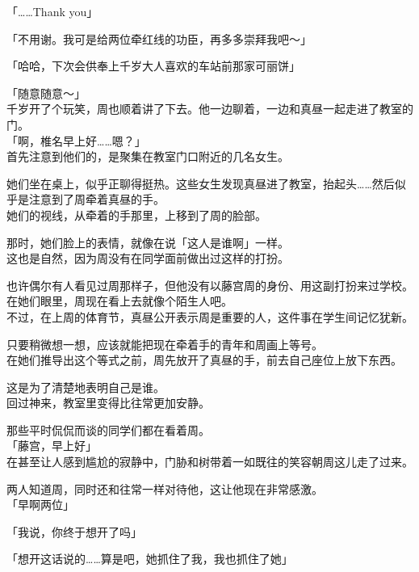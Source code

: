 「……Thank you」

「不用谢。我可是给两位牵红线的功臣，再多多崇拜我吧～」

「哈哈，下次会供奉上千岁大人喜欢的车站前那家可丽饼」

「随意随意～」\\

千岁开了个玩笑，周也顺着讲了下去。他一边聊着，一边和真昼一起走进了教室的门。\\

「啊，椎名早上好……嗯？」\\

首先注意到他们的，是聚集在教室门口附近的几名女生。

她们坐在桌上，似乎正聊得挺热。这些女生发现真昼进了教室，抬起头……然后似乎是注意到了周牵着真昼的手。\\

她们的视线，从牵着的手那里，上移到了周的脸部。

那时，她们脸上的表情，就像在说「这人是谁啊」一样。\\

这也是自然，因为周没有在同学面前做出过这样的打扮。

也许偶尔有人看见过周那样子，但他没有以藤宫周的身份、用这副打扮来过学校。在她们眼里，周现在看上去就像个陌生人吧。\\

不过，在上周的体育节，真昼公开表示周是重要的人，这件事在学生间记忆犹新。

只要稍微想一想，应该就能把现在牵着手的青年和周画上等号。\\

在她们推导出这个等式之前，周先放开了真昼的手，前去自己座位上放下东西。

这是为了清楚地表明自己是谁。\\

回过神来，教室里变得比往常更加安静。

那些平时侃侃而谈的同学们都在看着周。\\

「藤宫，早上好」\\

在甚至让人感到尴尬的寂静中，门胁和树带着一如既往的笑容朝周这儿走了过来。

两人知道周，同时还和往常一样对待他，这让他现在非常感激。\\

「早啊两位」

「我说，你终于想开了吗」

「想开这话说的……算是吧，她抓住了我，我也抓住了她」\\

